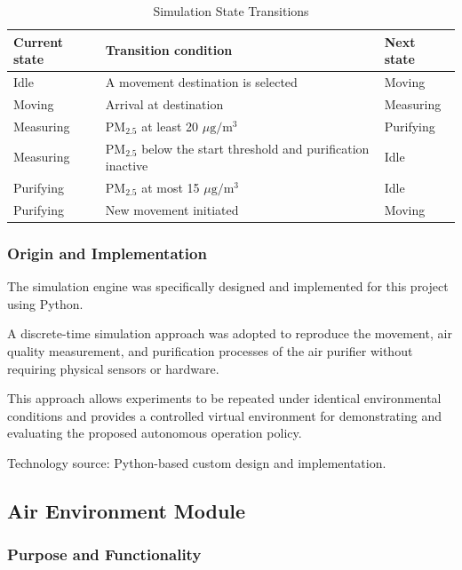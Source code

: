\documentclass[conference]{IEEEtran}
\newlength{\tablebodywidth}
\newcommand{\pmfine}{\ensuremath{\mathrm{PM}_{2.5}}}
\newcommand{\pmunit}{\ensuremath{\mu\mathrm{g}/\mathrm{m}^3}}
\begin{document}
\begin{table}[!t]
\caption{Simulation State Transitions}
\label{tab:t17}
\centering\footnotesize
\setlength{\tabcolsep}{3pt}
\setlength{\tablebodywidth}{\dimexpr\columnwidth-18pt\relax}
\begin{tabular}{>{\raggedright\arraybackslash}p{0.240\tablebodywidth}>{\raggedright\arraybackslash}p{0.520\tablebodywidth}>{\raggedright\arraybackslash}p{0.240\tablebodywidth}}
\toprule
\textbf{Current state} & \textbf{Transition condition} & \textbf{Next state} \\
\midrule
Idle & A movement destination is selected & Moving \\
Moving & Arrival at destination & Measuring \\
Measuring & \pmfine{} at least 20 \pmunit{} & Purifying \\
Measuring & \pmfine{} below the start threshold and purification inactive & Idle \\
Purifying & \pmfine{} at most 15 \pmunit{} & Idle \\
Purifying & New movement initiated & Moving \\
\bottomrule
\end{tabular}
\end{table}

\subsubsection{Origin and Implementation}

The simulation engine was specifically designed and implemented for this project using Python.

A discrete-time simulation approach was adopted to reproduce the movement, air quality measurement, and purification processes of the air purifier without requiring physical sensors or hardware.

This approach allows experiments to be repeated under identical environmental conditions and provides a controlled virtual environment for demonstrating and evaluating the proposed autonomous operation policy.

Technology source: Python-based custom design and implementation.

\subsection{Air Environment Module}

\subsubsection{Purpose and Functionality}
\end{document}
